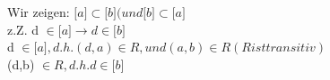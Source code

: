 \documentclass[11pt,a4paper]{article}
\begin{document}
Wir zeigen: $\lbrack a \rbrack \subset \lbrack b \rbrack (und \lbrack b \rbrack \subset \lbrack a \rbrack$\\
z.Z. d $\in \lbrack a \rbrack \rightarrow d \in \lbrack b \rbrack$ \\

d $\in \lbrack a \rbrack , d.h. (d,a) \in R, und (a,b) \in R (R ist transitiv)$\\
(d,b) $\in R,d.h. d \in \lbrack b \rbrack$
\end{document}
